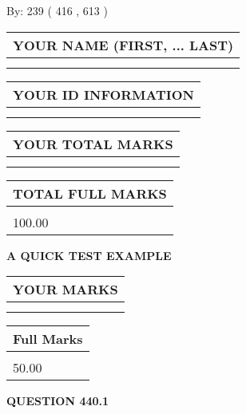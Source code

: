 \documentclass[12pt]{article}
\begin{document}
   
\hspace{1.0in} By: 
 239 ( 416 ,  613 )
   
   
   
   
\newpage 
\setcounter{page}{ 
   440001 } 
   
   
   
   
\noindent\begin{tabular}{|l|}
\hline
YOUR NAME (FIRST, ... LAST)  \\
\hline
 \\ 
 \\ 
\hline
\end{tabular}
\hspace{0.05in} \begin{tabular}{|l|}
\hline
 YOUR   ID   INFORMATION  \\
\hline
 \\ 
 \\ 
\hline
\end{tabular}
   
   
\vspace{0.2in}\noindent\begin{tabular}{|l|}
\hline
YOUR TOTAL MARKS  \\
\hline
 \\ 
 \\ 
\hline
\end{tabular}
\hspace{0.05in} \begin{tabular}{|l|}
\hline
TOTAL FULL MARKS  \\
\hline
 \\ 
100.00 \\
\hline
\end{tabular}
   
   
 \vspace{0.2in}
{\LARGE {\textbf{ A QUICK TEST EXAMPLE}}}
   
   
  
\vspace{0.2in}
  
\noindent\begin{tabular}{|l|}
\hline
 YOUR MARKS  \\
\hline
 \\ 
 \\ 
\hline
\end{tabular}
\hspace{0.05in} \begin{tabular}{|l|}
\hline
 Full Marks  \\
\hline
 \\ 
50.00 \\
\hline
\end{tabular}
{\textbf{\Large{QUESTION
440.1 
}}}
  
\end{document}
